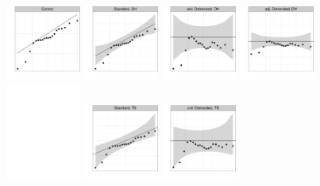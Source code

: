 \documentclass[12pt]{article}\usepackage[]{graphicx}\usepackage[]{color}
\begin{document}
\begin{figure}
\centering

\includegraphics[width=0.22\textwidth]{figures/qqplots-1}
\includegraphics[width=0.22\textwidth]{figures/qqplots-2}
\includegraphics[width=0.22\textwidth]{figures/qqplots-4}
\includegraphics[width=0.22\textwidth]{figures/qqplots-3}
\includegraphics[width=0.22\textwidth]{figures/blank}
\includegraphics[width=0.22\textwidth]{figures/qqplots-5}
\includegraphics[width=0.22\textwidth]{figures/qqplots-7}

\end{figure}
\end{document}
